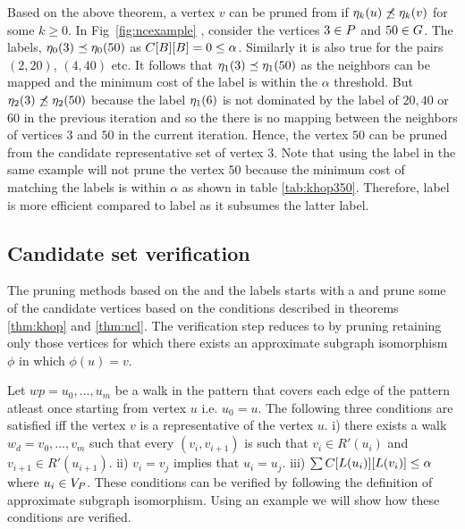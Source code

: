 Based on the above theorem, a vertex $v$ can be pruned from 
\CR if $\eta_{k}(u) \not\preceq \eta_{k}(v)$
for some $k \geq 0$. In Fig~\ref{fig:ncexample} , consider the vertices
$3 \in P$ and $50 \in G$. The \ncl labels, 
$\eta_{0}(3) \preceq \eta_{0}(50)$ as ${C}[B][B] = 0 \leq \alpha$.
Similarly it is also true for the pairs $(2, 20)$, $(4, 40)$ etc. It follows
that $\eta_{1}(3) \preceq \eta_{1}(50)$ as the neighbors can be mapped and
the minimum cost of the \khop label is within the $\alpha$ threshold. But
$\eta_{2}(3) \not\preceq \eta_{2}(50)$ because the \ncl label
$\eta_{1}(6)$ is not dominated by the \ncl label
of $20, 40$ or  $60$ in the previous iteration and so the
there is no mapping between the neighbors of vertices $3$ and 
$50$ in the current iteration. Hence, the vertex $50$
can be pruned from the candidate representative set of vertex $3$.
Note that using the \khop label in the same example will not prune the
vertex $50$ because the minimum cost of matching the \khop labels is within
$\alpha$ as shown in table \ref{tab:khop350}. Therefore, \ncl label is more
efficient compared to \khop label as it subsumes the latter label.

\subsection{Candidate set verification}
The pruning methods based on the \khop and the \ncl labels starts with a
\CR and prune some of the candidate vertices
based on the conditions described in theorems \ref{thm:khop} and \ref{thm:ncl}.
The verification step reduces \CR to \RS by pruning retaining only those vertices
for which there exists an approximate subgraph isomorphism $\phi$ in which $\phi(u) = v$.

Let $wp = u_0,\ldots, u_m$ be a walk in the pattern that covers each
edge of the pattern atleast once starting from vertex $u$ i.e. $u_0 = u$.
The following three conditions are satisfied iff the vertex $v$ is a
representative of the vertex $u$. i) there exists a walk $w_d = v_0,\ldots, v_m$
such that every $(v_i, v_{i+1})$ is such that $v_i \in R'(u_i)$ and
$v_{i+1} \in R'(u_{i+1})$. ii) $v_i = v_j$ implies that $u_i = u_j$. iii) 
$\sum{C}[L(u_i)][L(v_i)] \leq \alpha$ where $u_i \in V_P$. These 
conditions can be verified by following the definition of approximate
subgraph isomorphism. Using an example we will show how these conditions
are verified.

